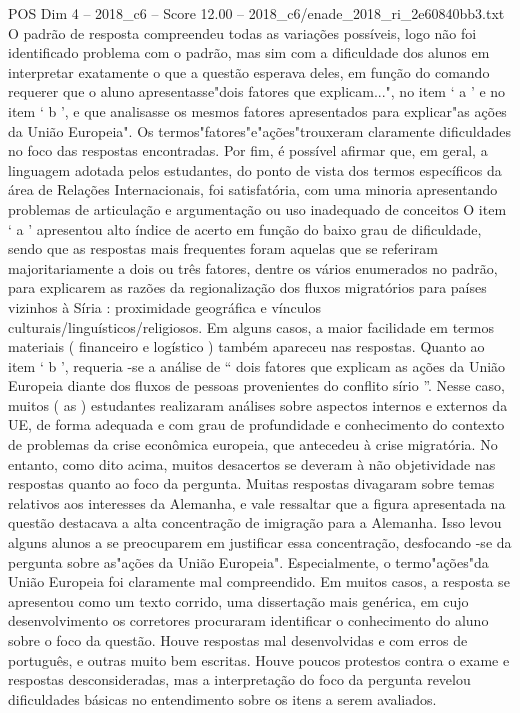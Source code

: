 \begin{textsample}{POS Dim 4 – 2018\_c6 – Score 12.00 – 2018\_c6/enade\_2018\_ri\_2e60840bb3.txt}
O padrão de resposta compreendeu todas as variações possíveis, logo não foi identificado problema com o padrão, mas sim com a dificuldade dos alunos em interpretar exatamente o que a questão esperava deles, em função do comando requerer que o aluno apresentasse"dois fatores que explicam...", no item ‘ a ’ e no item ‘ b ’, e que analisasse os mesmos fatores apresentados para explicar"as ações da União Europeia".
Os termos"fatores"e"ações"trouxeram claramente dificuldades no foco das respostas encontradas.
Por fim, é possível afirmar que, em geral, a linguagem adotada pelos estudantes, do ponto de vista dos termos específicos da área de Relações Internacionais, foi satisfatória, com uma minoria apresentando problemas de articulação e argumentação ou uso inadequado de conceitos O item ‘ a ’ apresentou alto índice de acerto em função do baixo grau de dificuldade, sendo que as respostas mais frequentes foram aquelas que se referiram majoritariamente a dois ou três fatores, dentre os vários enumerados no padrão, para explicarem as razões da regionalização dos fluxos migratórios para países vizinhos à Síria : proximidade geográfica e vínculos culturais/linguísticos/religiosos.
Em alguns casos, a maior facilidade em termos materiais ( financeiro e logístico ) também apareceu nas respostas.
Quanto ao item ‘ b ’, requeria -se a análise de “ dois fatores que explicam as ações da União Europeia diante dos fluxos de pessoas provenientes do conflito sírio ”.
Nesse caso, muitos ( as ) estudantes realizaram análises sobre aspectos internos e externos da UE, de forma adequada e com grau de profundidade e conhecimento do contexto de problemas da crise econômica europeia, que antecedeu à crise migratória.
No entanto, como dito acima, muitos desacertos se deveram à não objetividade nas respostas quanto ao foco da pergunta.
Muitas respostas divagaram sobre temas relativos aos interesses da Alemanha, e vale ressaltar que a figura apresentada na questão destacava a alta concentração de imigração para a Alemanha.
Isso levou alguns alunos a se preocuparem em justificar essa concentração, desfocando -se da pergunta sobre as"ações da União Europeia".
Especialmente, o termo"ações"da União Europeia foi claramente mal compreendido.
Em muitos casos, a resposta se apresentou como um texto corrido, uma dissertação mais genérica, em cujo desenvolvimento os corretores procuraram identificar o conhecimento do aluno sobre o foco da questão.
Houve respostas mal desenvolvidas e com erros de português, e outras muito bem escritas.
Houve poucos protestos contra o exame e respostas desconsideradas, mas a interpretação do foco da pergunta revelou dificuldades básicas no entendimento sobre os itens a serem avaliados.

\end{textsample}
